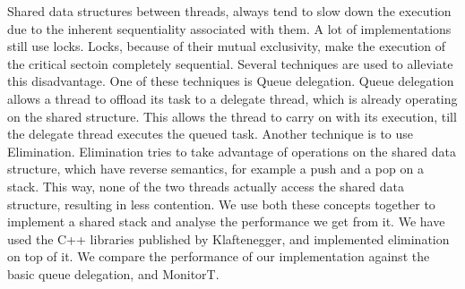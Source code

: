 \begin{Introduction}
Shared data structures between threads, always tend to slow down the execution due to the inherent sequentiality associated with them. A lot of implementations still use locks. Locks, because of their mutual exclusivity, make the execution of the critical sectoin completely sequential. Several techniques are used to alleviate this disadvantage. One of these techniques is Queue delegation. Queue delegation allows a thread to offload its task to a delegate thread, which is already operating on the shared structure. This allows the thread to carry on with its execution, till the delegate thread executes the queued task. Another technique is to use Elimination. Elimination tries to take advantage of operations on the shared data structure, which have reverse semantics, for example a push and a pop on a stack. This way, none of the two threads actually access the shared data structure, resulting in less contention. 
We use both these concepts together to implement a shared stack and analyse the performance we get from it. We have used the C++ libraries published by Klaftenegger, and implemented elimination on top of it. We compare the performance of our implementation against the basic queue delegation, and MonitorT.
\end{Introduction}

